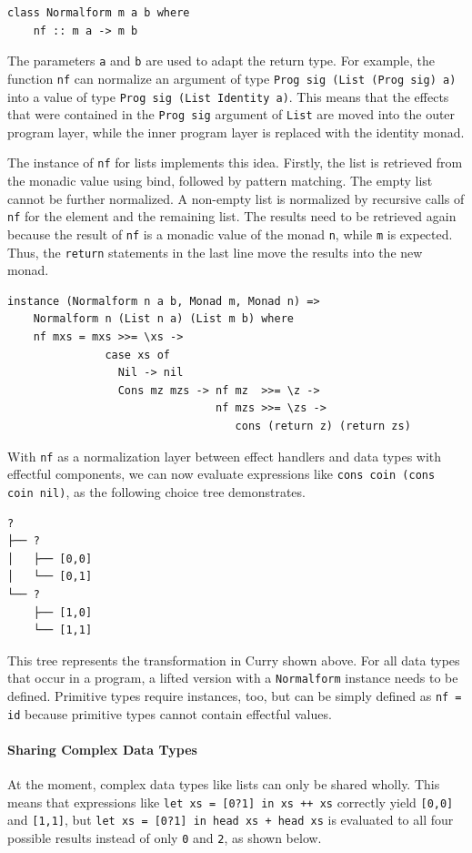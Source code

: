 \documentclass[a4paper, 11pt, fleqn, twoside]{scrreprt}
\newcommand{\hinl}[1]{\texttt{#1}}
\begin{document}
\begin{verbatim}
class Normalform m a b where
    nf :: m a -> m b
\end{verbatim}

The parameters \hinl{a} and \hinl{b} are used to adapt the return type.
For example, the function \hinl{nf} can normalize an argument of type \hinl{Prog sig (List (Prog sig) a)} into a value of type \hinl{Prog sig (List Identity a)}.
This means that the effects that were contained in the \hinl{Prog sig} argument of \hinl{List} are moved into the outer program layer, while the inner program layer is replaced with the identity monad.

The instance of \hinl{nf} for lists implements this idea.
Firstly, the list is retrieved from the monadic value using bind, followed by pattern matching.
The empty list cannot be further normalized.
A non-empty list is normalized by recursive calls of \hinl{nf} for the element and the remaining list.
The results need to be retrieved again because the result of \hinl{nf} is a monadic value of the monad \hinl{n}, while \hinl{m} is expected.
Thus, the \hinl{return} statements in the last line move the results into the new monad.
\begin{verbatim}
instance (Normalform n a b, Monad m, Monad n) =>
    Normalform n (List n a) (List m b) where
    nf mxs = mxs >>= \xs ->
               case xs of
                 Nil -> nil
                 Cons mz mzs -> nf mz  >>= \z ->
                                nf mzs >>= \zs ->
                                   cons (return z) (return zs)
\end{verbatim}

With \hinl{nf} as a normalization layer between effect handlers and data types with effectful components, we can now evaluate expressions like \hinl{cons coin (cons coin nil)}, as the following choice tree demonstrates.

\begin{verbatim}
? 
├── ? 
│   ├── [0,0]
│   └── [0,1]
└── ? 
    ├── [1,0]
    └── [1,1]
\end{verbatim}

This tree represents the transformation in Curry shown above.
For all data types that occur in a program, a lifted version with a \hinl{Normalform} instance needs to be defined.
Primitive types require instances, too, but can be simply defined as \hinl{nf = id} because primitive types cannot contain effectful values.

\paragraph{Sharing Complex Data Types}
At the moment, complex data types like lists can only be shared wholly.
This means that expressions like \hinl{let xs = [0?1] in xs ++ xs} correctly yield \hinl{[0,0]} and \hinl{[1,1]}, but \hinl{let xs = [0?1] in head xs + head xs} is evaluated to all four possible results instead of only \hinl{0} and \hinl{2}, as shown below.
\end{document}
